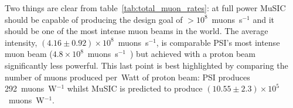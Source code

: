 Two things are clear from table~\ref{tab:total_muon_rates}: at full power MuSIC should be capable of producing the design goal of \(>10^8\)~muons~s\(^{-1}\) and it should be one of the most intense muon beams in the world. The average intensity, \((4.16\pm0.92)\times10^8\)~muons~s\(^{-1}\), is comparable PSI's most intense muon beam (\(4.8\times10^8\)~muons~s\(^{-1}\)~\cite{mue4_psi}) but achieved with a proton beam significantly less powerful. This last point is best highlighted by comparing the number of muons produced per~Watt of proton beam: PSI produces 292~muons~W\(^{-1}\) whilst MuSIC is predicted to produce \((10.55\pm2.3)\times10^5\)~muons~W\(^{-1}\).





